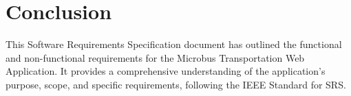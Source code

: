 \documentclass{BusMateSRS}
\begin{document}
\chapter{Conclusion}
This Software Requirements Specification document has outlined the functional 
and non-functional requirements for the Microbus Transportation Web Application. 
It provides a comprehensive understanding of the application's purpose, scope, 
and specific requirements, following the IEEE Standard for SRS.



\end{document}
